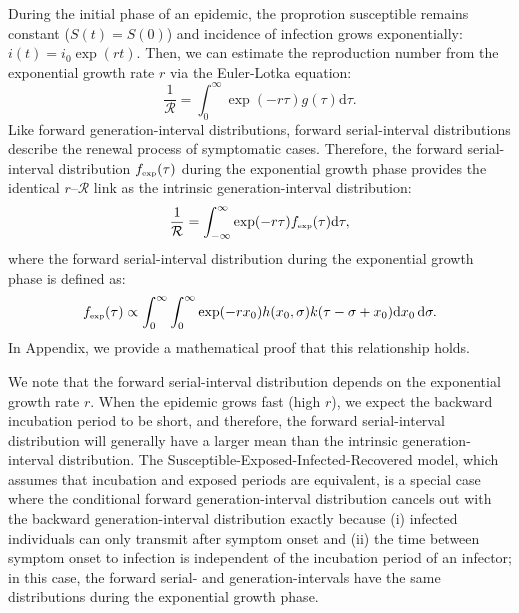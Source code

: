 \documentclass[12pt]{article}
\begin{document}
During the initial phase of an epidemic, the proprotion susceptible remains constant ($S(t) = S(0)$) and incidence of infection grows exponentially: $i(t)=i_0\exp(rt)$.
Then, we can estimate the reproduction number from the exponential growth rate $r$ via the Euler-Lotka equation:
\begin{equation}
\frac{1}{\mathcal R} = \int_0^\infty \exp(-r\tau) g(\tau) \mathrm{d} \tau.
\end{equation}
Like forward generation-interval distributions, 
forward serial-interval distributions describe the renewal process of symptomatic cases.
Therefore, the forward serial-interval distribution $f_{\textrm{\tiny exp}}(\tau)$ during the exponential growth phase provides the identical $r$--$\mathcal R$ link as the intrinsic generation-interval distribution:
\begin{equation}
\frac{1}{\mathcal R} = \int_{-\infty}^\infty \exp(-r\tau) f_{\textrm{\tiny exp}}(\tau) \mathrm{d} \tau,
\end{equation}
where the forward serial-interval distribution during the exponential growth phase is defined as:
\begin{equation}
f_{\textrm{\tiny exp}}(\tau) \propto \int_{0}^\infty \int_{0}^\infty \exp( -r x_0) h(x_0, \sigma) k(\tau-\sigma+x_0) \mathrm{d} x_0\, \mathrm{d}\sigma.
\end{equation}
In Appendix, we provide a mathematical proof that this relationship holds.

We note that the forward serial-interval distribution depends on the exponential growth rate $r$.
When the epidemic grows fast (high $r$), we expect the backward incubation period to be short, and therefore, the forward serial-interval distribution will generally have a larger mean than the intrinsic generation-interval distribution.
The Susceptible-Exposed-Infected-Recovered model, which assumes that incubation and exposed periods are equivalent, is a special case where the conditional forward generation-interval distribution cancels out with the backward generation-interval distribution exactly because (i) infected individuals can only transmit after symptom onset and (ii) the time between symptom onset to infection is independent of the incubation period of an infector;
in this case, the forward serial- and generation-intervals have the same distributions during the exponential growth phase.
\end{document}
